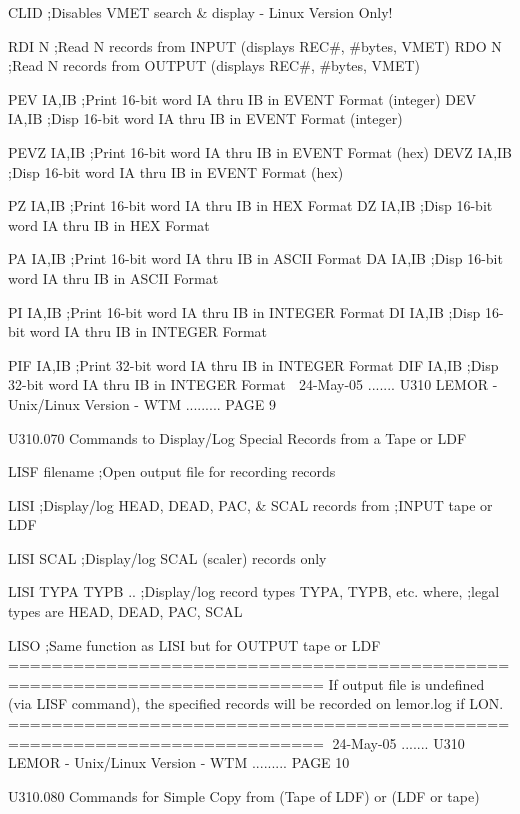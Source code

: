    CLID          ;Disables VMET search & display - Linux Version Only!
 
   RDI  N        ;Read    N records from INPUT  (displays REC#, #bytes, VMET)
   RDO  N        ;Read    N records from OUTPUT (displays REC#, #bytes, VMET)
 
   PEV  IA,IB    ;Print 16-bit word IA thru IB in EVENT   Format (integer)
   DEV  IA,IB    ;Disp  16-bit word IA thru IB in EVENT   Format (integer)
 
   PEVZ IA,IB    ;Print 16-bit word IA thru IB in EVENT   Format (hex)
   DEVZ IA,IB    ;Disp  16-bit word IA thru IB in EVENT   Format (hex)
 
   PZ   IA,IB    ;Print 16-bit word IA thru IB in HEX     Format
   DZ   IA,IB    ;Disp  16-bit word IA thru IB in HEX     Format
 
   PA   IA,IB    ;Print 16-bit word IA thru IB in ASCII   Format
   DA   IA,IB    ;Disp  16-bit word IA thru IB in ASCII   Format
 
   PI   IA,IB    ;Print 16-bit word IA thru IB in INTEGER Format
   DI   IA,IB    ;Disp  16-bit word IA thru IB in INTEGER Format
 
   PIF  IA,IB    ;Print 32-bit word IA thru IB in INTEGER Format
   DIF  IA,IB    ;Disp  32-bit word IA thru IB in INTEGER Format
    
   24-May-05 ....... U310  LEMOR - Unix/Linux Version - WTM ......... PAGE   9
 
   U310.070  Commands to  Display/Log Special Records from a Tape or LDF
 
   LISF filename ;Open output file for recording records
 
   LISI          ;Display/log HEAD, DEAD, PAC, & SCAL records from
                 ;INPUT tape or LDF
 
   LISI SCAL     ;Display/log SCAL (scaler) records only
 
   LISI TYPA TYPB .. ;Display/log record types TYPA, TYPB, etc. where,
                     ;legal types are HEAD, DEAD, PAC, SCAL
 
   LISO          ;Same function as LISI but for OUTPUT tape or LDF
   ===========================================================================
   If output file is undefined (via LISF command), the specified records
   will be recorded on lemor.log if LON.
   ===========================================================================
    
   24-May-05 ....... U310  LEMOR - Unix/Linux Version - WTM ......... PAGE  10
 
 
   U310.080  Commands for Simple  Copy from (Tape of LDF) or (LDF or tape)
 
